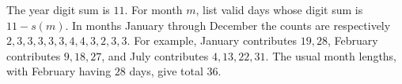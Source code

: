 The year digit sum is $11$. For month $m$, list valid days whose digit sum is $11-s(m)$. In months January through December the counts are respectively $2,3,3,3,3,3,4,4,3,2,3,3$. For example, January contributes $19,28$, February contributes $9,18,27$, and July contributes $4,13,22,31$. The usual month lengths, with February having $28$ days, give total $\boxed{36}$.
